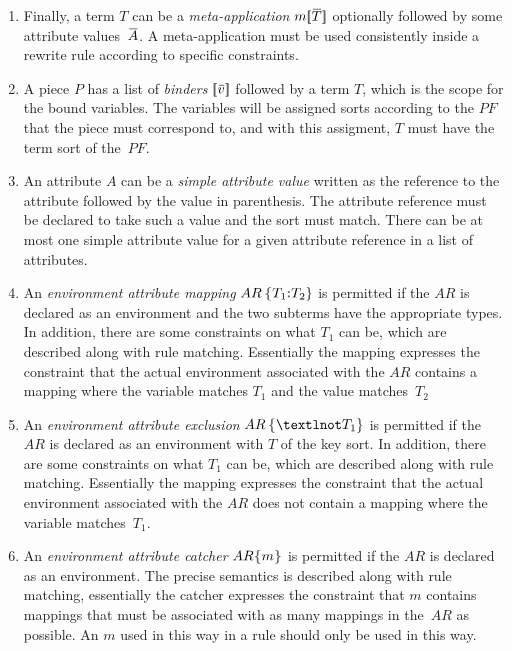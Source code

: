 \documentclass[11pt]{article} %
\begin{document}
\begin{enumerate}
\item\label{note:t-meta} Finally, a term $T$ can be a \emph{meta-application} $m\kw[\ov{T}\kw]$
  optionally followed by some attribute values~$\ov{A}$. A meta-application must be used
  consistently inside a rewrite rule according to specific constraints.

\item\label{note:piece} A piece $P$ has a list of \emph{binders} $\kw[\ov{v}\kw]$ followed by a term $T$, which is the
  scope for the bound variables. The variables will be assigned sorts according to the $PF$ that the
  piece must correspond to, and with this assigment, $T$ must have the term sort of the~$PF$.

\item\label{note:a-value} An attribute $A$ can be a \emph{simple attribute value} written as the reference to the
  attribute followed by the value in parenthesis. The attribute reference must be declared to take
  such a value and the sort must match. There can be at most one simple attribute value for a given
  attribute reference in a list of attributes.

\item\label{note:a-map} An \emph{environment attribute mapping} $AR\,\kw\{T_1\kw:T_2\}$ is permitted
  if the $AR$ is declared as an environment and the two subterms have the appropriate types. In
  addition, there are some constraints on what $T_1$ can be, which are described along with rule
  matching. Essentially the mapping expresses the constraint that the actual environment associated
  with the $AR$ contains a mapping where the variable matches $T_1$ and the value matches~$T_2$

\item\label{note:a-not} An \emph{environment attribute exclusion} $AR\,\kw\{¬T_1\}$ is permitted if
  the $AR$ is declared as an environment with $T$ of the key sort. In addition, there are some
  constraints on what $T_1$ can be, which are described along with rule matching. Essentially the
  mapping expresses the constraint that the actual environment associated with the $AR$ does not
  contain a mapping where the variable matches~$T_1$.

\item\label{note:a-catch} An \emph{environment attribute catcher} $AR\kw\{m\kw\}$ is permitted if
  the $AR$ is declared as an environment. The precise semantics is described along with rule
  matching, essentially the catcher expresses the constraint that $m$ contains mappings that must be
  associated with as many mappings in the~$AR$ as possible. An $m$ used in this way in a rule should
  only be used in this way.


\end{enumerate}
\end{document}
